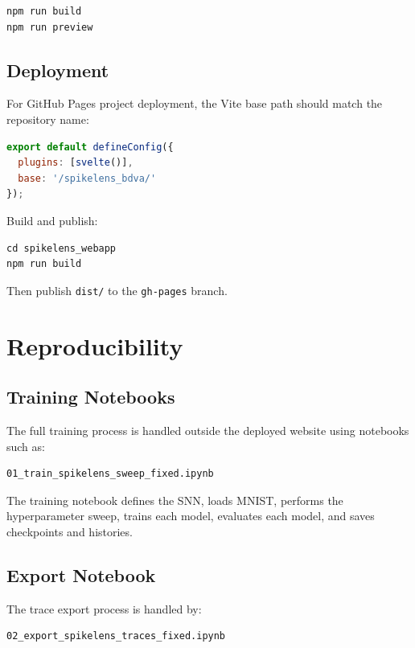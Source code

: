 \documentclass[11pt,a4paper]{article}
\begin{document}
\begin{lstlisting}
npm run build
npm run preview
\end{lstlisting}

\subsection{Deployment}

For GitHub Pages project deployment, the Vite base path should match the repository name:

\begin{lstlisting}[language=JavaScript]
export default defineConfig({
  plugins: [svelte()],
  base: '/spikelens_bdva/'
});
\end{lstlisting}

Build and publish:

\begin{lstlisting}
cd spikelens_webapp
npm run build
\end{lstlisting}

Then publish \texttt{dist/} to the \texttt{gh-pages} branch.

\section{Reproducibility}

\subsection{Training Notebooks}

The full training process is handled outside the deployed website using notebooks such as:

\begin{lstlisting}
01_train_spikelens_sweep_fixed.ipynb
\end{lstlisting}

The training notebook defines the SNN, loads MNIST, performs the hyperparameter sweep, trains each model, evaluates each model, and saves checkpoints and histories.

\subsection{Export Notebook}

The trace export process is handled by:

\begin{lstlisting}
02_export_spikelens_traces_fixed.ipynb
\end{lstlisting}
\end{document}
